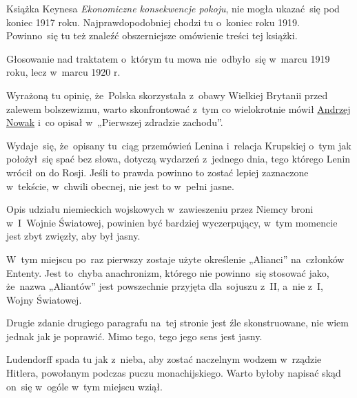 \documentclass[a4paper,11pt]{article}
\begin{document}
\start {} Książka Keynesa \emph{Ekonomiczne konsekwencje
  pokoju}, nie mogła ukazać~się pod koniec 1917 roku.
Najprawdopodobniej chodzi tu o~koniec roku 1919. Powinno~się tu też
znaleźć obszerniejsze omówienie treści tej książki.

\vspace{\spaceFour}


\start {} Głosowanie nad traktatem o~którym tu mowa
nie~odbyło~się w~marcu 1919 roku, lecz w~marcu 1920 r.

\vspace{\spaceFour}


\start {} Wyrażoną tu opinię, że~Polska skorzystała z~obawy
Wielkiej Brytanii przed zalewem bolszewizmu, warto skonfrontować z~tym
co wielokrotnie mówił
\href{https://www.youtube.com/watch?v=yfQ7rpq_irA}{Andrzej Nowak} i~co
opisał w~„Pierwszej zdradzie zachodu”.

\vspace{\spaceFour}


\start {} Wydaje~się, że~opisany tu~ciąg przemówień Lenina
i~relacja Krupskiej o~tym jak położył~się spać bez słowa, dotyczą
wydarzeń z~jednego dnia, tego którego Lenin wrócił on do Rosji. Jeśli
to prawda powinno to zostać lepiej zaznaczone w~tekście, w~chwili
obecnej, nie jest to w~pełni jasne.

\vspace{\spaceFour}


\start {} Opis udziału niemieckich wojskowych w~zawieszeniu
przez Niemcy broni w~I~Wojnie Światowej, powinien być bardziej
wyczerpujący, w~tym momencie jest zbyt zwięzły, aby był jasny.

\vspace{\spaceFour}


\start {} W~tym miejscu po~raz pierwszy zostaje użyte
określenie „Alianci” na~członków Ententy. Jest to~chyba anachronizm,
którego nie powinno~się stosować jako, że~nazwa „Aliantów” jest
powszechnie przyjęta dla~sojuszu z~II, a~nie z~I, Wojny Światowej.

\vspace{\spaceFour}


\start {} Drugie zdanie drugiego paragrafu na~tej stronie jest
źle skonstruowane, nie wiem jednak jak je poprawić. Mimo tego, tego
jego sens jest jasny.

\vspace{\spaceFour}


\start {} Ludendorff spada tu jak z~nieba, aby zostać naczelnym
wodzem w~rządzie Hitlera, powołanym podczas puczu monachijskiego.
Warto byłoby napisać skąd on~się w~ogóle w~tym miejscu wziął.
\end{document}

